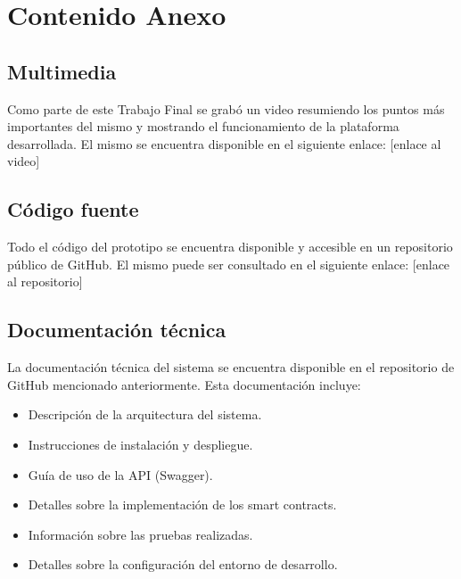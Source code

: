 \chapter{Contenido Anexo}
\label{cp:annex-content}

\parindent0pt

\section{Multimedia}

Como parte de este Trabajo Final se grabó un video resumiendo los puntos más importantes del mismo y mostrando el funcionamiento de la plataforma desarrollada. El mismo se encuentra disponible en el siguiente enlace: [enlace al video] %

\section{Código fuente}

Todo el código del prototipo se encuentra disponible y accesible en un repositorio público de GitHub. El mismo puede ser consultado en el siguiente enlace: [enlace al repositorio] %

\section{Documentación técnica}

La documentación técnica del sistema se encuentra disponible en el repositorio de GitHub mencionado anteriormente. Esta documentación incluye:
\begin{itemize}
		\item Descripción de la arquitectura del sistema.
		\item Instrucciones de instalación y despliegue.
		\item Guía de uso de la API (Swagger).
		\item Detalles sobre la implementación de los smart contracts.
		\item Información sobre las pruebas realizadas.
		\item Detalles sobre la configuración del entorno de desarrollo.
\end{itemize}

